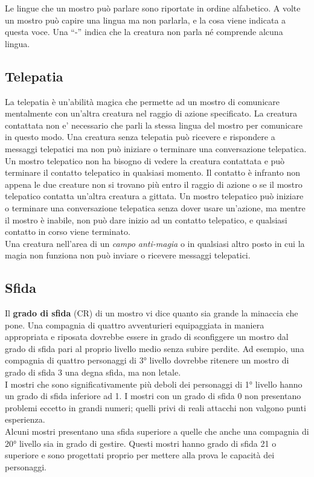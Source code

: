 \begin{multicols}{2}
Le lingue che un mostro può parlare sono riportate in ordine alfabetico. A volte un mostro può capire una lingua ma non parlarla, e la cosa viene indicata a questa voce. Una ``-'' indica che la creatura non parla né comprende alcuna lingua.

\subsection{Telepatia}

La telepatia è un'abilità magica che permette ad un mostro di comunicare mentalmente con un'altra creatura nel raggio di azione specificato. La creatura contattata non e' necessario che parli la stessa lingua del mostro per comunicare in questo modo. Una creatura senza telepatia può ricevere e rispondere a messaggi telepatici ma non può iniziare o terminare una conversazione telepatica.\\
Un mostro telepatico non ha bisogno di vedere la creatura contattata e può terminare il contatto telepatico in qualsiasi momento. Il contatto è infranto non appena le due creature non si trovano più entro il raggio di azione o se il mostro telepatico contatta un'altra creatura a gittata. Un mostro telepatico può iniziare o terminare una conversazione  telepatica senza dover usare un'azione, ma mentre il mostro è inabile, non può dare inizio ad un contatto telepatico, e qualsiasi contatto in corso viene terminato.\\
Una creatura nell'area di un \emph{campo anti-magia} o in qualsiasi altro posto in cui la magia non funziona non può inviare o ricevere messaggi telepatici.

\subsection{Sfida}

Il \textbf{grado di sfida} (CR) di un mostro vi dice quanto sia grande la minaccia che pone. Una compagnia di quattro avventurieri equipaggiata in maniera appropriata e riposata dovrebbe essere in grado di sconfiggere un mostro dal grado di sfida pari al proprio livello medio senza subire perdite. Ad esempio, una compagnia di quattro personaggi di 3° livello dovrebbe ritenere un mostro di grado di sfida 3 una degna sfida, ma non letale.\\
I mostri che sono significativamente più deboli dei personaggi di 1° livello hanno un grado di sfida inferiore ad 1. I mostri con un grado di sfida 0 non presentano problemi eccetto in grandi numeri; quelli privi di reali attacchi non valgono punti esperienza.\\
Alcuni mostri presentano una sfida superiore a quelle che anche una compagnia di 20° livello sia in grado di gestire. Questi mostri hanno grado di sfida 21 o superiore e sono progettati proprio per mettere alla prova le capacità dei personaggi.\\


\end{multicols}
